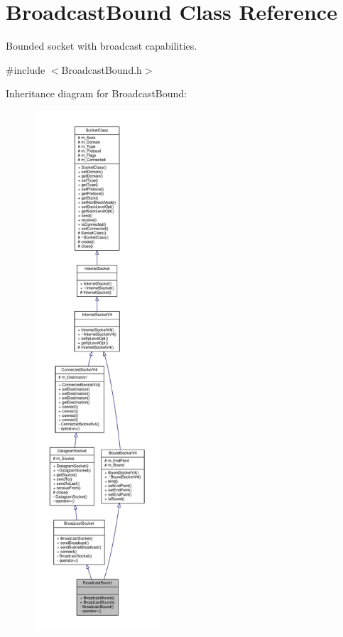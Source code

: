 \hypertarget{classBroadcastBound}{}\section{Broadcast\+Bound Class Reference}
\label{classBroadcastBound}


Bounded socket with broadcast capabilities.  




{\ttfamily \#include $<$Broadcast\+Bound.\+h$>$}



Inheritance diagram for Broadcast\+Bound\+:\nopagebreak
\begin{figure}[H]
\begin{center}
\leavevmode
\includegraphics[height=550pt]{classBroadcastBound__inherit__graph}
\end{center}
\end{figure}
